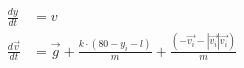 \documentclass[preview]{standalone}
\begin{document}
\begin{align*}
\quad\\
            \frac{d y }{dt}&=v     \quad\\
            \frac{d\vec{v}}{dt}&=\vec{g}+\frac{k\cdot(80- y _i-l)}{m}+\frac{(-\vec{v_i}-|\vec{v_i}|\vec{v_i})}{m}
\end{align*}
\end{document}
